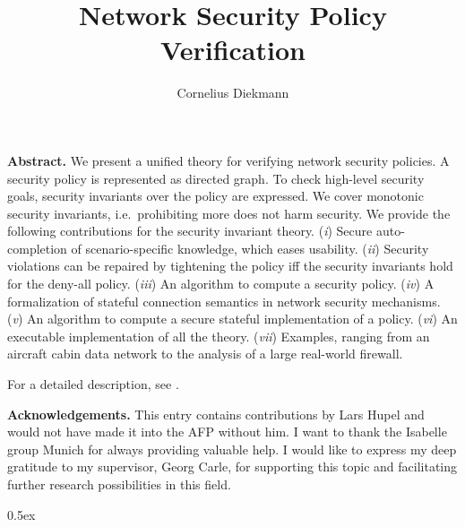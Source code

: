 \documentclass[11pt,a4paper]{article}
\begin{document}
\title{Network Security Policy Verification}
\author{Cornelius Diekmann}
\maketitle

\begin{trivlist}
\item \textbf{Abstract.}
We present a unified theory for verifying network security policies.
A security policy is represented as directed graph.
To check high-level security goals, security invariants over the policy are expressed.
We cover monotonic security invariants, i.e.\ prohibiting more does not harm security.
We provide the following contributions for the security invariant theory.
(\emph{i}) Secure auto-completion of scenario-specific knowledge, which eases usability.
(\emph{ii}) Security violations can be repaired by tightening the policy iff the security invariants hold for the deny-all policy.
(\emph{iii}) An algorithm to compute a security policy.
(\emph{iv}) A formalization of stateful connection semantics in network security mechanisms.
(\emph{v}) An algorithm to compute a secure stateful implementation of a policy.
(\emph{vi}) An executable implementation of all the theory.
(\emph{vii}) Examples, ranging from an aircraft cabin data network to the analysis of a large real-world firewall.

For a detailed description, see \cite{diekmann2014forte,diekmann2014esss}. 
\end{trivlist}

\medskip

\begin{trivlist}
\item \textbf{Acknowledgements.} This entry contains contributions by Lars Hupel and would not have made it into the AFP without him.
I want to thank the Isabelle group Munich for always providing valuable help.
I would like to express my deep gratitude to my supervisor, Georg Carle, for supporting this topic and facilitating further research possibilities in this field.
\end{trivlist}

\tableofcontents

\parindent 0pt\parskip 0.5ex

\newpage





\end{document}
